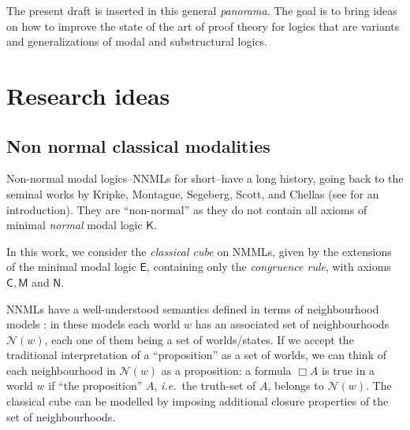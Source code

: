 \documentclass[11pt,a4paper]{article}
\newcommand{\K}{\mathsf{K}}
\newcommand{\E}{\mathsf{E}}
\newcommand{\axC}{\mathsf{C}}
\newcommand{\axM}{\mathsf{M}}
\newcommand{\axN}{\mathsf{N}}
\newcommand{\N}{\mathcal{N}}
\newcommand\ie{\hbox{\textit{i.e.}}}
\begin{document}
The present draft is inserted in this general {\em panorama}. The goal is to
bring ideas on how to improve the state of the art of proof theory for logics that are variants and generalizations of modal and substructural logics. 

 
\section{Research ideas} 

\subsection{Non normal classical modalities} 
Non-normal modal logics--NNMLs for short--have a long history, going back to the seminal works by Kripke, Montague, Segeberg, Scott, and Chellas (see 
\cite{Chellas:1980fk} for an introduction). They are ``non-normal'' as they do not contain all axioms of minimal \emph{normal} modal logic  $\K$. 

In this work, we consider  the {\em classical cube} on NMMLs, given by the extensions of the  minimal modal logic $\E$, containing only the {\em congruence rule}, 
with axioms $\axC, \axM$ and $\axN$.


NNMLs have a well-understood semantics defined in terms of
neighbourhood models \cite{Pacuit:2017}: in these models  each world $w$ has an
associated set of neighbourhoods $\N(w)$, each one of them being a set
of worlds/states.  If we accept the traditional interpretation of a ``proposition'' as a set of worlds, we can think of  each neighbourhood  in $\N(w)$ as a proposition: a formula
$\Box A$ is true in a world $w$ if ``the proposition'' $A$, \ie\ the truth-set of $A$, belongs to
$\N(w)$.  The classical cube can be modelled by imposing additional closure properties of the set of neighbourhoods.  

\end{document}
